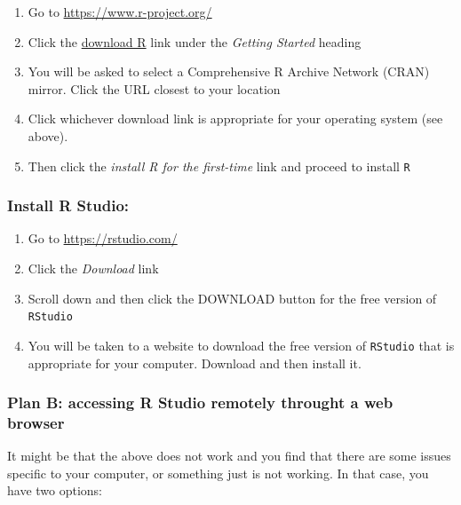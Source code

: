 \documentclass[
]{book}
\begin{document}
\begin{enumerate}
\def\labelenumi{\arabic{enumi}.}
\item
  Go to \url{https://www.r-project.org/}
\item
  Click the \href{https://cran.r-project.org/mirrors.html}{download R} link under the \emph{Getting Started} heading
\item
  You will be asked to select a Comprehensive R Archive Network (CRAN) mirror. Click the URL closest to your location
\item
  Click whichever download link is appropriate for your operating system (see above).
\item
  Then click the \emph{install R for the first-time} link and proceed to install \texttt{R}
\end{enumerate}

\hypertarget{install-r-studio}{%
\subsubsection*{Install R Studio:}\label{install-r-studio}}

\begin{enumerate}
\def\labelenumi{\arabic{enumi}.}
\item
  Go to \url{https://rstudio.com/}
\item
  Click the \emph{Download} link
\item
  Scroll down and then click the DOWNLOAD button for the free version of
  \texttt{RStudio}
\item
  You will be taken to a website to download the free version of \texttt{RStudio} that is appropriate for your computer. Download and then install it.
\end{enumerate}

\hypertarget{plan-b-accessing-r-studio-remotely-throught-a-web-browser}{%
\subsubsection{Plan B: accessing R Studio remotely throught a web browser}\label{plan-b-accessing-r-studio-remotely-throught-a-web-browser}}

It might be that the above does not work and you find that there are some issues specific to your computer, or something just is not working. In that case, you have two options:
\end{document}
